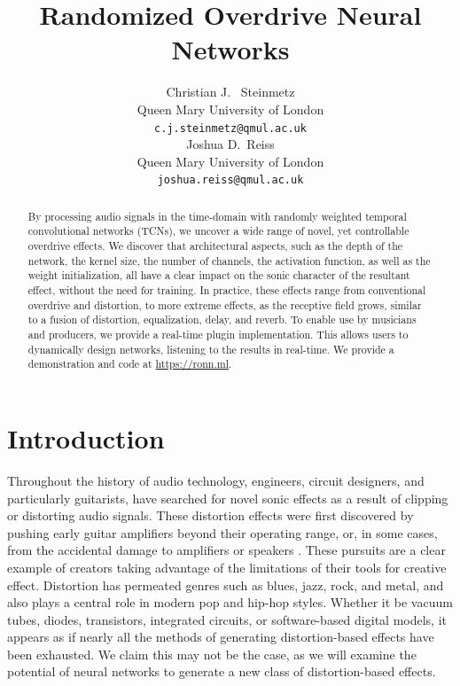 \documentclass{article}
\title{Randomized Overdrive Neural Networks}
\author{%
  Christian J. ~Steinmetz \\
  Queen Mary University of London\\
  \texttt{c.j.steinmetz@qmul.ac.uk} \\
  \And
  Joshua D.~Reiss \\
  Queen Mary University of London \\
  \texttt{joshua.reiss@qmul.ac.uk} \\
}
\begin{document}
\maketitle

\begin{abstract}
By processing audio signals in the time-domain with randomly weighted temporal convolutional networks (TCNs),
we uncover a wide range of novel, yet controllable overdrive effects.
We discover that architectural aspects, such as the depth of the network, 
the kernel size, the number of channels, the activation function, as well as the weight initialization, 
all have a clear impact on the sonic character of the resultant effect, without the need for training. 
In practice, these effects range from conventional overdrive and distortion,
to more extreme effects, as the receptive field grows, similar to a fusion of distortion, equalization, delay, and reverb.  
To enable use by musicians and producers, we provide a real-time plugin implementation.
This allows users to dynamically design networks, listening to the results in real-time.
We provide a demonstration and code at \url{https://ronn.ml}.
\end{abstract} 



\section{Introduction}

Throughout the history of audio technology, engineers, circuit designers, 
and particularly guitarists, have searched for novel sonic effects as a result of clipping or distorting audio signals. 
These distortion effects were first discovered by pushing early guitar amplifiers beyond their operating range, 
or, in some cases, from the accidental damage to amplifiers or speakers \cite{shepherd2003distortion}. 
These pursuits are a clear example of creators taking advantage of the limitations of their tools for creative effect.
Distortion has permeated genres such as blues, jazz, rock, and metal, and also plays a central role in modern pop and hip-hop styles.
Whether it be vacuum tubes, diodes, transistors, integrated circuits, or software-based digital models,
it appears as if nearly all the methods of generating distortion-based effects have been exhausted.
We claim this may not be the case, as we will examine the potential of neural networks to generate a new class of distortion-based effects. 
\end{document}
